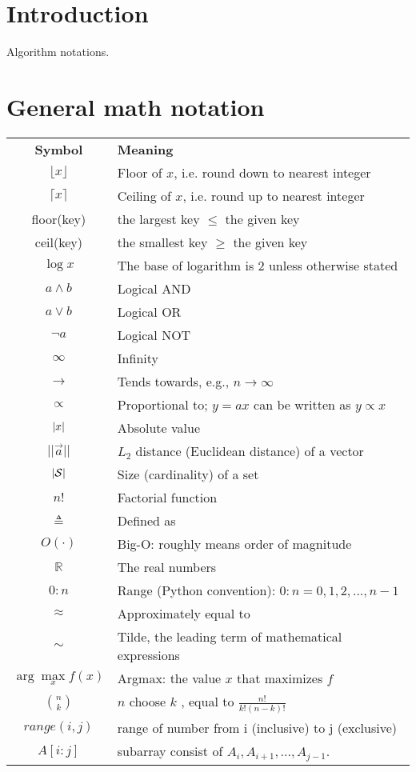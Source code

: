 \label{sec:Notation}

\section*{Introduction}
Algorithm notations. 


\section*{General math notation}

\begin{longtable}{cl}
\hline\noalign{\smallskip}
\textbf{Symbol} & \textbf{Meaning} \\
\noalign{\smallskip}\hline\noalign{\smallskip}
$\lfloor x \rfloor$ & Floor of $x$, i.e. round down to nearest integer\\
$\lceil x \rceil$ & Ceiling of $x$, i.e. round up to nearest integer\\
floor(key) & the largest key $\leq$ the given key \\
ceil(key) & the smallest key $\geq$ the given key \\
$\log x$ & The base of logarithm is 2 unless otherwise stated\\
$a \wedge b$ & Logical AND\\
$a \vee b$ & Logical OR\\
$\neg a$ & Logical NOT\\
$\infty$ & Infinity\\
$\rightarrow$ & Tends towards, e.g., $n \rightarrow \infty$\\
$\propto$ &Proportional to; $y = ax$ can be written as $y \propto x$\\
$\left\lvert x\right\rvert$ & Absolute value\\
$||\vec{a}||$ & $L_2$ distance (Euclidean distance) of a vector \\
$\left\lvert\mathcal{S}\right\rvert$ & Size (cardinality) of a set\\
$n!$ & Factorial function\\
$\triangleq$ & Defined as\\
$O(\cdot)$ & Big-O: roughly means order of magnitude\\
$\mathbb{R}$ & The real numbers\\
$0:n$ & Range (Python convention): $0:n = {0, 1, 2,...,n-1}$\\
$\approx$ & Approximately equal to\\
$\sim$ & Tilde, the leading term of mathematical expressions \\
$\arg\max\limits_x f(x)$ & Argmax: the value $x$ that maximizes $f$\\
$\binom{n}{k}$ & $n$ choose $k$ , equal to $\frac{n!}{k!(n-k)!}$\\
$range(i,j)$ & range of number from i (inclusive) to j (exclusive) \\
$A[i:j]$ & subarray consist of $A_i, A_{i+1}, ..., A_{j-1}$.
\noalign{\smallskip}\hline\noalign{\smallskip}
\end{longtable}


\twocolumn
